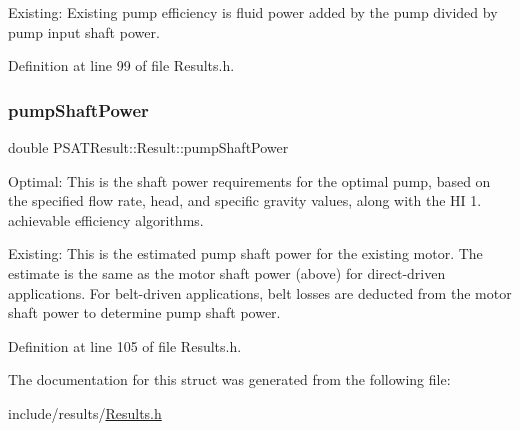 Existing\+: Existing pump efficiency is fluid power added by the pump divided by pump input shaft power. 

Definition at line 99 of file Results.\+h.

\mbox{\label{struct_p_s_a_t_result_1_1_result_a6787157a580ee3755910e18e792a4dbf}} 
\subsubsection{\texorpdfstring{pump\+Shaft\+Power}{pumpShaftPower}}
{\footnotesize\ttfamily double P\+S\+A\+T\+Result\+::\+Result\+::pump\+Shaft\+Power}



Optimal\+: This is the shaft power requirements for the optimal pump, based on the specified flow rate, head, and specific gravity values, along with the HI 1. achievable efficiency algorithms. 

Existing\+: This is the estimated pump shaft power for the existing motor. The estimate is the same as the motor shaft power (above) for direct-\/driven applications. For belt-\/driven applications, belt losses are deducted from the motor shaft power to determine pump shaft power. 

Definition at line 105 of file Results.\+h.



The documentation for this struct was generated from the following file\+:\begin{DoxyCompactItemize}
\item 
include/results/\hyperlink{_results_8h}{Results.\+h}\end{DoxyCompactItemize}
